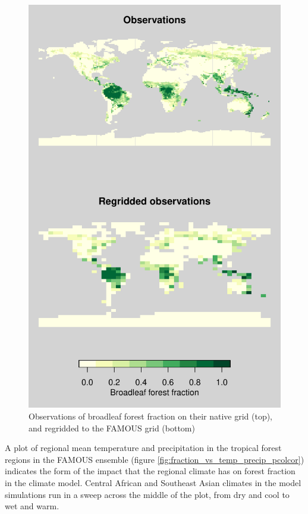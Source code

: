 \documentclass[gmd, manuscript]{copernicus}
\begin{document}
\begin{figure}[t]
\includegraphics[width=12cm]{../graphics/map_comparison.pdf}
\caption{Observations of broadleaf forest fraction on their native grid (top), and regridded to the FAMOUS grid (bottom)}
\label{fig:map_comparison}
\end{figure}

A plot of regional mean temperature and precipitation in the tropical forest regions in the FAMOUS ensemble (figure \ref{fig:fraction_vs_temp_precip_pcolcor}) indicates the form of the impact that the regional climate has on forest fraction in the climate model. Central African and Southeast Asian climates in the model simulations run in a sweep across the middle of the plot, from dry and cool to wet and warm. 
\end{document}
